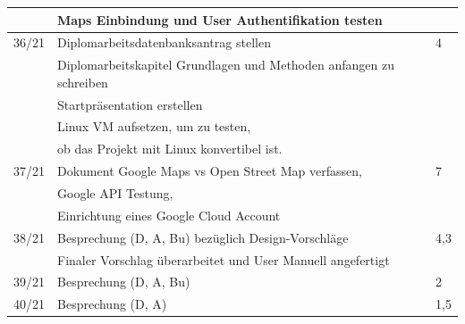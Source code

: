 \begin{table}[h]
\begin{tabular}{|l|l|l|}
				& Maps Einbindung und User Authentifikation testen&\\ \hline
		36/21   & Diplomarbeitsdatenbanksantrag stellen & 4\\
				& Diplomarbeitskapitel Grundlagen und Methoden anfangen zu schreiben&\\
				& Startpräsentation erstellen&\\
				& Linux VM aufsetzen, um zu testen,&\\
				& ob das Projekt mit Linux konvertibel ist.&\\ \hline
		37/21   & Dokument Google Maps vs Open Street Map verfassen, & 7 \\
				& Google API Testung, & \\
				& Einrichtung eines Google Cloud Account &\\ \hline
		38/21   & Besprechung (D, A, Bu) bezüglich Design-Vorschläge & 4,3 \\
				& Finaler Vorschlag überarbeitet und User Manuell angefertigt& \\ \hline
		39/21	&	Besprechung (D, A, Bu) & 2 \\ \hline
		40/21	&	Besprechung (D, A) & 1,5 \\ \hline
		
				
			
	\end{tabular}
\end{table}

